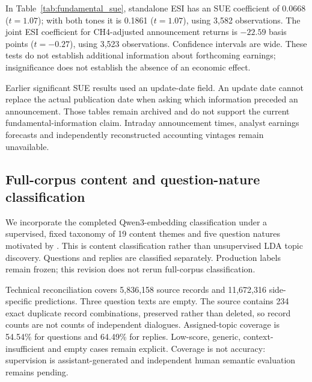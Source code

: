 In Table~\ref{tab:fundamental_sue}, standalone ESI has an SUE coefficient of 0.0668 ($t=1.07$); with both tones it is 0.1861 ($t=1.07$), using 3,582 observations. The joint ESI coefficient for CH4-adjusted announcement returns is $-22.59$ basis points ($t=-0.27$), using 3,523 observations. Confidence intervals are wide. These tests do not establish additional information about forthcoming earnings; insignificance does not establish the absence of an economic effect.

Earlier significant SUE results used an update-date field. An update date cannot replace the actual publication date when asking which information preceded an announcement. Those tables remain archived and do not support the current fundamental-information claim. Intraday announcement times, analyst earnings forecasts and independently reconstructed accounting vintages remain unavailable.


\subsection{Full-corpus content and question-nature classification}\label{sec:topic_heterogeneity}
We incorporate the completed Qwen3-embedding classification under a supervised, fixed taxonomy of 19 content themes and five question natures motivated by \citet{lee2022shall}. This is content classification rather than unsupervised LDA topic discovery. Questions and replies are classified separately. Production labels remain frozen; this revision does not rerun full-corpus classification.

Technical reconciliation covers 5,836,158 source records and 11,672,316 side-specific predictions. Three question texts are empty. The source contains 234 exact duplicate record combinations, preserved rather than deleted, so record counts are not counts of independent dialogues. Assigned-topic coverage is 54.54\% for questions and 64.49\% for replies. Low-score, generic, context-insufficient and empty cases remain explicit. Coverage is not accuracy: supervision is assistant-generated and independent human semantic evaluation remains pending.

